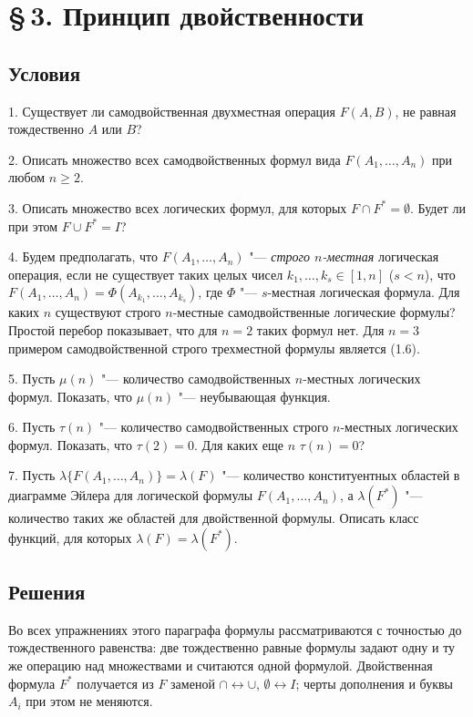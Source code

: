 \section*{\S\,3. Принцип двойственности}
\subsection*{Условия}
1. Существует ли самодвойственная двухместная операция $F(A,B)$, не равная
тождественно $A$ или $B$?

2. Описать множество всех самодвойственных формул вида $F(A_1,\dots,A_n)$
при любом $n\ge2$.

3. Описать множество всех логических формул, для которых
$F\cap F^*=\emptyset$. Будет ли при этом $F\cup F^*=I$?

4. Будем
предполагать, что $F(A_1,\dots,A_n)$ "--- \emph{строго $n$-местная}
логическая операция, если не существует таких целых чисел
$k_1,\dots,k_s\in[1,n]$ ($s<n$), что
$F(A_1,\dots,A_n)=\Phi(A_{k_1},\dots,A_{k_s})$, где $\Phi$ "--- $s$-местная
логическая формула. Для каких $n$ существуют строго $n$-местные
самодвойственные логические формулы? Простой перебор показывает, что для
$n=2$ таких формул нет. Для $n=3$ примером самодвойственной строго
трехместной формулы является (1.6).

5. Пусть $\mu(n)$ "--- количество самодвойственных $n$-местных логических
формул. Показать, что $\mu(n)$ "--- неубывающая функция.

6. Пусть $\tau(n)$ "--- количество самодвойственных строго $n$-местных
логических формул. Показать, что $\tau(2)=0$. Для каких еще $n$
$\tau(n)=0$?

7. Пусть $\lambda\{F(A_1,\dots,A_n)\}=\lambda(F)$ "--- количество
конституентных областей в диаграмме Эйлера для логической формулы
$F(A_1,\dots,A_n)$, а $\lambda(F^*)$ "--- количество таких же областей для
двойственной формулы. Описать класс функций, для которых
$\lambda(F)=\lambda(F^*)$.

\subsection*{Решения}

Во всех упражнениях этого параграфа формулы рассматриваются с точностью до
тождественного равенства: две тождественно равные формулы задают одну и ту
же операцию над множествами и считаются одной формулой. Двойственная
формула $F^*$ получается из $F$ заменой $\cap\leftrightarrow\cup$,
$\emptyset\leftrightarrow I$; черты дополнения и буквы $A_i$ при этом не
меняются.

